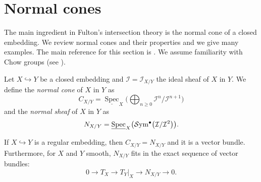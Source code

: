 \documentclass[pdftex]{sigma}
\numberwithin{equation}{section}
\begin{document}
\section{Normal cones}\label{normalcones}

The main ingredient in Fulton's intersection theory is the normal cone of a closed embedding. We review normal cones and their properties and we give many examples. The main reference for this section is \cite[Chapters~4 and~5]{Fulton}. We assume familiarity with Chow groups (see \cite[Chapters~1 and~2]{Fulton}).

\begin{Definition}
Let $X\hookrightarrow Y$ be a closed embedding and $\mathcal I=\mathcal{I}_{X/Y}$ the ideal sheaf of $X$ in $Y$. We define the
\emph{normal cone} of $X$ in $Y$ as
\[C_{X/Y}=\underline{\operatorname{Spec}}_X\bigg(\bigoplus_{n\geq 0}\mathcal{I}^n/\mathcal{I}^{n+1}\bigg)\]
and the \emph{normal sheaf} of $X$ in $Y$ as
\[N_{X/Y}=\underline{\operatorname{Spec}}_X\big({\mathcal S}{\rm ym}^\bullet \big(\mathcal{I}/\mathcal{I}^2\big)\big).\]
\end{Definition}

\begin{Example}
If $X\hookrightarrow Y$ is a regular embedding, then $C_{X/Y}=N_{X/Y}$ and it is a vector bundle. Furthermore, for $X$ and $Y$ smooth, $N_{X/Y}$ fits in the exact sequence of vector bundles:
\[0\to T_X\to T_{Y}\rvert_X\to N_{X/Y}\to 0.\]
\end{Example}
\end{document}
